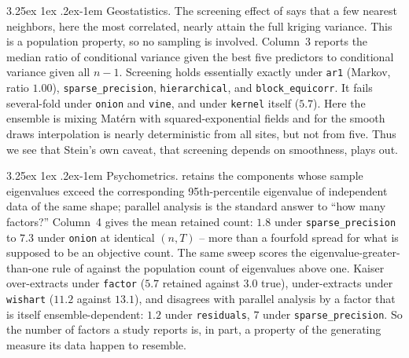 \documentclass[11pt]{article}
\makeatletter
\renewcommand\paragraph{\@startsection{paragraph}{4}{\z@}%
  {3.25ex \@plus1ex \@minus.2ex}{-1em}%
  {\normalfont\normalsize\itshape}}
\makeatother
\begin{document}
\paragraph{Geostatistics.} The screening effect of \citet{stein2002} says
that a few nearest neighbors, here the most correlated, nearly attain the
full kriging variance. This is a population property, so no sampling is
involved. Column~3 reports the median ratio of conditional variance given
the best five predictors to conditional variance given all $n-1$.
Screening holds essentially exactly under \texttt{ar1} (Markov, ratio
$1.00$), \texttt{sparse\_precision}, \texttt{hierarchical}, and
\texttt{block\_equicorr}. It fails several-fold under \texttt{onion} and
\texttt{vine}, and under \texttt{kernel} itself ($5.7$). Here the ensemble
is mixing Mat\'ern with squared-exponential fields and for the smooth draws
interpolation is nearly deterministic from all sites, but not from five.
Thus we see that Stein's own caveat, that screening depends on smoothness, plays out.

\paragraph{Psychometrics.} \citet{horn1965} retains the components whose
sample eigenvalues exceed the corresponding 95th-percentile eigenvalue of
independent data of the same shape; parallel analysis is the standard
answer to ``how many factors?'' Column~4 gives the mean retained count:
$1.8$ under \texttt{sparse\_precision} to $7.3$ under \texttt{onion} at
identical $(n,T)$ -- more than a fourfold spread for what is supposed to
be an objective count. The same sweep scores the eigenvalue-greater-than-one rule of \citet{kaiser1960} against the population count of
eigenvalues above one. Kaiser over-extracts under \texttt{factor} ($5.7$
retained against $3.0$ true), under-extracts under \texttt{wishart}
($11.2$ against $13.1$), and disagrees with parallel analysis by a factor
that is itself ensemble-dependent: $1.2$ under \texttt{residuals}, $7$
under \texttt{sparse\_precision}. So the number of factors a study reports
is, in part, a property of the generating measure its data happen to resemble.
\end{document}
